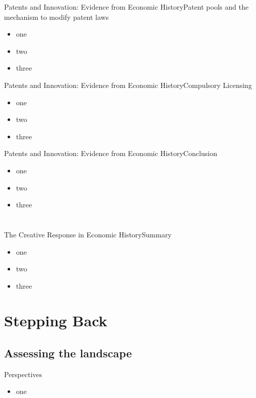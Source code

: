 \documentclass{beamer}
\begin{document}
\begin{frame}{Patents and Innovation: Evidence from Economic History}{Patent pools and the mechanism to modify patent laws}
\begin{itemize}
\item<1->{one}
\item<2->{two}
\item<3->{three}
\end{itemize}
\end{frame}

\begin{frame}{Patents and Innovation: Evidence from Economic History}{Compulsory Licensing}
\begin{itemize}
\item<1->{one}
\item<2->{two}
\item<3->{three}
\end{itemize}
\end{frame}

\begin{frame}{Patents and Innovation: Evidence from Economic History}{Conclusion}
\begin{itemize}
\item<1->{one}
\item<2->{two}
\item<3->{three}
\end{itemize}
\end{frame}


\section{\cite{Schumpeter1947}}
\begin{frame}{The Creative Response in Economic History}{Summary}
\begin{itemize}
\item<1->{one}
\item<2->{two}
\item<3->{three}
\end{itemize}
\end{frame}

\section{Stepping Back}
\subsection{Assessing the landscape}
\begin{frame}{Perspectives}{}
\begin{itemize}
\item<1->{one}
\end{itemize}
\end{frame}




\end{document}
